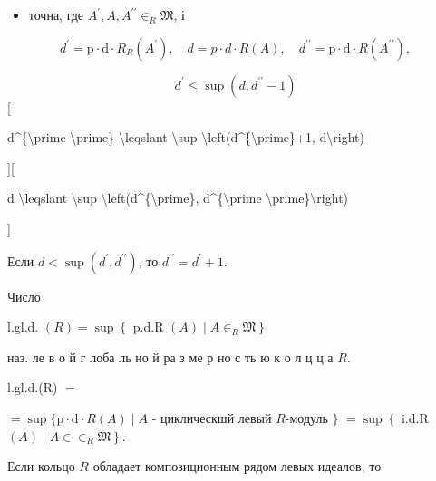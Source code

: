 \documentclass[10pt]{article}
\begin{document}
\begin{itemize}

  \item точна, где $A^{\prime}, A, A^{\prime \prime} \in_{R} \mathfrak{M}$, і

\end{itemize}



\[

d^{\prime}=\mathrm{p} \cdot \mathrm{d} \cdot R_{R}\left(A^{\prime}\right), \quad d=p \cdot d \cdot R(A), \quad d^{\prime \prime}=\mathrm{p} \cdot \mathrm{d} \cdot R\left(A^{\prime \prime}\right),

\]



\[

d^{\prime} \leqslant \sup \left(d, d^{\prime \prime}-1\right)

\][



d\^{}\{\textbackslash prime \textbackslash prime\} \textbackslash leqslant \textbackslash sup \textbackslash left(d\^{}\{\textbackslash prime\}+1, d\textbackslash right)



][



d \textbackslash leqslant \textbackslash sup \textbackslash left(d\^{}\{\textbackslash prime\}, d\^{}\{\textbackslash prime \textbackslash prime\}\textbackslash right)

]



Если $d<\sup \left(d^{\prime}, d^{\prime \prime}\right)$, то $d^{\prime \prime}=d^{\prime}+1$.



Число



l.gl.d. $(R)=\sup \left\{\right.$ p.d.R $\left.(A) \mid A \in_{R} \mathfrak{M}\right\}$



наз. ле в о й $г$ лоба ль но й ра з ме р но с ть ю к о л ц ц а $R$.



l.gl.d.(R) $=$



$=\sup \{\mathrm{p} \cdot \mathrm{d} \cdot R(A) \mid A$ - циклическшй левый $R$-модуль $\}$ $=\sup \left\{\right.$ i.d.R $\left.(A) \mid A \in \in_{R} \mathfrak{M}\right\}$.



Если кольцо $R$ обладает композиционным рядом левых идеалов, то
\end{document}
